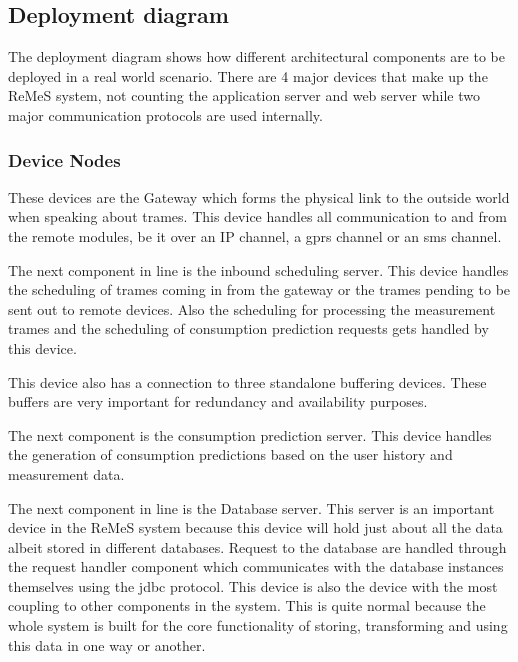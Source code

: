 \subsection{Deployment diagram}
	
The deployment diagram shows how different architectural components are to be deployed
in a real world scenario. There are 4 major devices that make up the ReMeS system, not counting the 
application server and web server while two major communication protocols are used internally.
\subsubsection{Device Nodes}
These devices are the Gateway which forms the physical link to the outside world when speaking about trames.
This device handles all communication to and from the remote modules, be it over an IP channel, a gprs channel
or an sms channel. 

The next component in line is the inbound scheduling server. This device handles the scheduling of trames coming in from the gateway
or the trames pending to be sent out to remote devices. 
Also the scheduling for processing the measurement trames and the scheduling of consumption prediction
requests gets handled by this device.

This device also has a connection to three standalone buffering devices. 
These buffers are very important for redundancy and availability purposes.

The next component is the consumption prediction server. This device handles the generation of consumption predictions
based on the user history and measurement data. 

The next component in line is the Database server. This server is an important device in the ReMeS system because this
device will hold just about all the data albeit stored in different databases. Request to the database are handled through
the request handler component which communicates with the database instances themselves using the jdbc protocol.
This device is also the device with the most coupling to other components in the system. This is quite normal because the whole system
is built for the core functionality of storing, transforming and using this data in one way or another.

